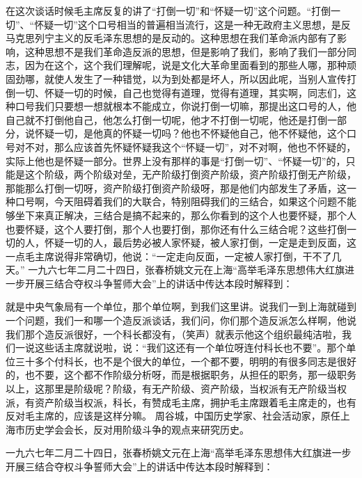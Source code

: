 \begin{maonote}
在这次谈话时候毛主席反复的讲了“打倒一切”和“怀疑一切”这个问题。“打倒一切”、“怀疑一切”这个口号相当的普遍相当流行，这是一种无政府主义思想，是反马克思列宁主义的反毛泽东思想的是反动的。这种思想在我们革命派内部有了影响，这种思想不是我们革命造反派的思想，但是影响了我们，影响了我们一部分同志，因为在这个，这个我们理解呢，说是文化大革命里面看到的那些人哪，那种顽固劲哪，就使人发生了一种错觉，以为到处都是坏人，所以因此呢，当别人宣传打倒一切、怀疑一切的时候，自己也觉得有道理，觉得有道理，其实啊，同志们，这种口号我们只要想一想就根本不能成立，你说打倒一切嘛，那提出这口号的人，他自己就不打倒他自己，他怎么打倒一切呢，他才不打倒一切呢，他还是打倒一部分，说怀疑一切，是他真的怀疑一切吗？他也不怀疑他自己，他不怀疑他，这个口号对不对，那么应该首先怀疑怀疑我这个“怀疑一切”，对不对啊，他也不怀疑的，实际上他也是怀疑一部分。世界上没有那样的事是“打倒一切”、“怀疑一切”的，只能是这个阶级，两个阶级对垒，无产阶级打倒资产阶级，资产阶级打倒无产阶级，那能那么打倒一切呀，资产阶级打倒资产阶级呀，那是他们内部发生了矛盾，这一种口号啊，今天阻碍着我们的大联合，特别阻碍我们的三结合，如果这个问题不能够坐下来真正解决，三结合是搞不起来的，那么你看到的这个人也要怀疑，那个人也要怀疑，这个人要打倒，那个人也要打倒，那你还有什么三结合呢？这些打倒一切的人，怀疑一切的人，最后势必被人家怀疑，被人家打倒，一定是走到反面，这一点毛主席说得非常确切，他说：“一定走向反面，一定被人家打倒，干不了几天。”
一九六七年二月二十四日，张春桥姚文元在上海“高举毛泽东思想伟大红旗进一步开展三结合夺权斗争誓师大会”上的讲话中传达本段时解释到：

就是中央气象局有一个单位，那个单位啊，到我们这里讲。说我们一到上海就碰到一个问题，我们一和哪一个造反派谈话，我们问，你们那个造反派怎么样啊，他说我们那个造反派很好，一个科长都没有，（笑声）就表示他这个组织最纯洁啦，我们一说这些话主席就说啦，说：“我们这还有一个单位呀连付科长也不要”。那个单位三十多个付科长，也不是个很大的单位，一个都不要，明明的有很多同志是很好的，也不要，这个都不作阶级分析呀，而是根据职务，从担任的职务，那一级职务以上，这那里是阶级呢？阶级，有无产阶级、资产阶级，当权派有无产阶级当权派，有资产阶级当权派，科长，有赞成毛主席，拥护毛主席跟着毛主席走的，也有反对毛主席的，应该是这样分嘛。
周谷城，中国历史学家、社会活动家，原任上海市历史学会会长，反对用阶级斗争的观点来研究历史。

一九六七年二月二十四日，张春桥姚文元在上海“高举毛泽东思想伟大红旗进一步开展三结合夺权斗争誓师大会”上的讲话中传达本段时解释到：


\end{maonote}

